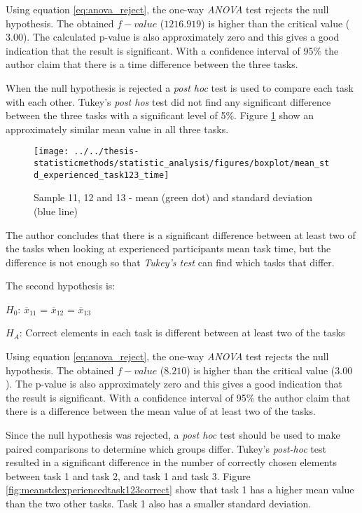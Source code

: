 Using equation \ref{eq:anova_reject}, the one-way \textit{ANOVA} test rejects the null hypothesis. The obtained $f-value$ ($1216.919$) is higher than the critical value ($3.00$). The calculated p-value is also approximately zero and this gives a good indication that the result is significant. With a confidence interval of 95\% the author claim that there is a time difference between the three tasks. 

When the null hypothesis is rejected a \textit{post hoc} test is used to compare each task with each other. Tukey's \textit{post hos} test did not find any significant difference between the three tasks with a significant level of 5\%. Figure \ref{fig:meanstdexperiencedtask123time} show an approximately similar mean value in all three tasks. %

\begin{figure}[H]
	\centering
	\texttt{[image: ../../thesis-statisticmethods/statistic\_analysis/figures/boxplot/mean\_std\_experienced\_task123\_time]}
	\caption{Sample 11, 12 and 13 - mean (green dot) and standard deviation (blue line)}
	\label{fig:meanstdexperiencedtask123time}
\end{figure}

The author concludes that there is a significant difference between at least two of the tasks when looking at experienced participants mean task time, but the difference is not enough so that \textit{Tukey's test} can find which tasks that differ. \newline

The second hypothesis is:\\
\centerline{$H_{0}$: $\overline{x}_11$ = $\overline{x}_12$ = $\overline{x}_13$}
\centerline{$H_{A}$: Correct elements in each task is different between at least two of the tasks}

Using equation \ref{eq:anova_reject}, the one-way \textit{ANOVA} test rejects the null hypothesis. The obtained $f-value$ ($8.210$) is higher than the critical value ($3.00$). The p-value is also approximately zero and this gives a good indication that the result is significant. With a confidence interval of 95\% the author claim that there is a difference between the mean value of at least two of the tasks. 

Since the null hypothesis was rejected, a \textit{post hoc} test should be used to make paired comparisons to determine which groups differ. Tukey's \textit{post-hoc} test resulted in a significant difference in the number of correctly chosen elements between task 1 and task 2, and task 1 and task 3. Figure \ref{fig:meanstdexperiencedtask123correct} show that task 1 has a higher mean value than the two other tasks. Task 1 also has a smaller standard deviation. 

